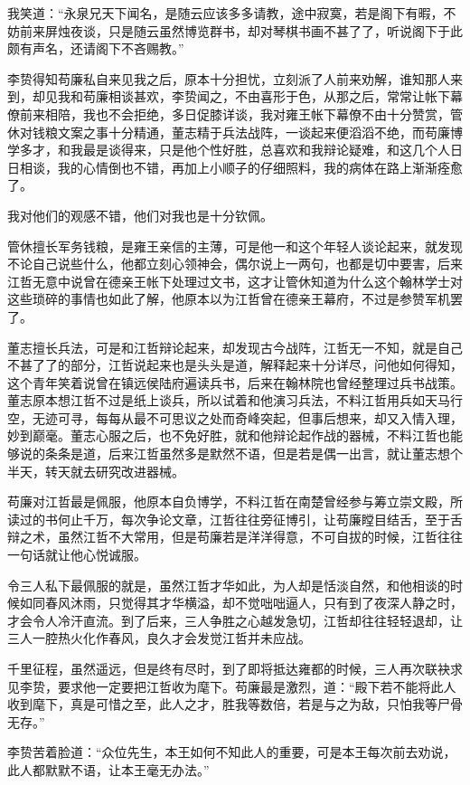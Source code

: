 我笑道：“永泉兄天下闻名，是随云应该多多请教，途中寂寞，若是阁下有暇，不妨前来屏烛夜谈，只是随云虽然博览群书，却对琴棋书画不甚了了，听说阁下于此颇有声名，还请阁下不吝赐教。”

李贽得知苟廉私自来见我之后，原本十分担忧，立刻派了人前来劝解，谁知那人来到，却见我和苟廉相谈甚欢，李贽闻之，不由喜形于色，从那之后，常常让帐下幕僚前来相陪，我也不会拒绝，多日促膝详谈，我对雍王帐下幕僚不由十分赞赏，管休对钱粮文案之事十分精通，董志精于兵法战阵，一谈起来便滔滔不绝，而苟廉博学多才，和我最是谈得来，只是他个性好胜，总喜欢和我辩论疑难，和这几个人日日相谈，我的心情倒也不错，再加上小顺子的仔细照料，我的病体在路上渐渐痊愈了。

我对他们的观感不错，他们对我也是十分钦佩。

管休擅长军务钱粮，是雍王亲信的主薄，可是他一和这个年轻人谈论起来，就发现不论自己说些什么，他都立刻心领神会，偶尔说上一两句，也都是切中要害，后来江哲无意中说曾在德亲王帐下处理过文书，这才让管休知道为什么这个翰林学士对这些琐碎的事情也如此了解，他原本以为江哲曾在德亲王幕府，不过是参赞军机罢了。

董志擅长兵法，可是和江哲辩论起来，却发现古今战阵，江哲无一不知，就是自己不甚了了的部分，江哲说起来也是头头是道，解释起来十分详尽，问他如何得知，这个青年笑着说曾在镇远侯陆府遍读兵书，后来在翰林院也曾经整理过兵书战策。董志原本想江哲不过是纸上谈兵，所以试着和他演习兵法，不料江哲用兵如天马行空，无迹可寻，每每从最不可思议之处而奇峰突起，但事后想来，却又入情入理，妙到巅毫。董志心服之后，也不免好胜，就和他辩论起作战的器械，不料江哲也能够说的条条是道，后来江哲虽然多是默然不语，但是若是偶一出言，就让董志想个半天，转天就去研究改进器械。

苟廉对江哲最是佩服，他原本自负博学，不料江哲在南楚曾经参与筹立崇文殿，所读过的书何止千万，每次争论文章，江哲往往旁征博引，让苟廉瞠目结舌，至于舌辩之术，虽然江哲不大常用，但是苟廉若是洋洋得意，不可自拔的时候，江哲往往一句话就让他心悦诚服。

令三人私下最佩服的就是，虽然江哲才华如此，为人却是恬淡自然，和他相谈的时候如同春风沐雨，只觉得其才华横溢，却不觉咄咄逼人，只有到了夜深人静之时，才会令人冷汗直流。到了后来，三人争胜之心越发急切，江哲却往往轻轻退却，让三人一腔热火化作春风，良久才会发觉江哲并未应战。

千里征程，虽然遥远，但是终有尽时，到了即将抵达雍都的时候，三人再次联袂求见李贽，要求他一定要把江哲收为麾下。苟廉最是激烈，道：“殿下若不能将此人收到麾下，真是可惜之至，此人之才，胜我等数倍，若是与之为敌，只怕我等尸骨无存。”

李贽苦着脸道：“众位先生，本王如何不知此人的重要，可是本王每次前去劝说，此人都默默不语，让本王毫无办法。”

